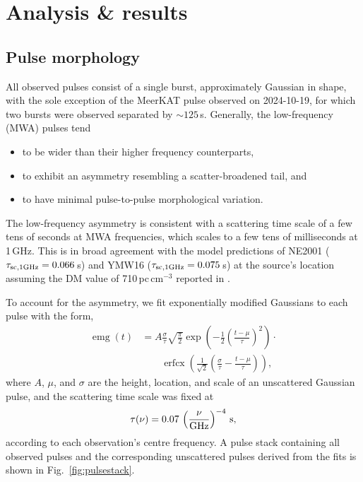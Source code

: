 \documentclass[fleqn,usenatbib]{mnras}
\DeclareMathOperator{\erfcx}{erfcx}
\DeclareMathOperator{\emg}{emg}
\newcommand{\Fig}{Fig.}
\begin{document}
\section{Analysis \& results} \label{sec:analysis}


\subsection{Pulse morphology}

All observed pulses consist of a single burst, approximately Gaussian in shape, with the sole exception of the MeerKAT pulse observed on 2024-10-19, for which two bursts were observed separated by ${\sim}125\,$s.
Generally, the low-frequency (MWA) pulses tend
\begin{itemize}
    \item to be wider than their higher frequency counterparts,
    \item to exhibit an asymmetry resembling a scatter-broadened tail, and
    \item to have minimal pulse-to-pulse morphological variation.
\end{itemize}

The low-frequency asymmetry is consistent with a scattering time scale of a few tens of seconds at MWA frequencies, which scales to a few tens of milliseconds at 1\,GHz.
This is in broad agreement with the model predictions of NE2001 ($\tau_{\rm sc,1GHz} = 0.066\,$s) and YMW16 ($\tau_{\rm sc,1 GHz} = 0.075\,$s) at the source's location assuming the DM value of 710\,pc\,cm$^{-3}$ reported in .

To account for the asymmetry, we fit exponentially modified Gaussians to each pulse with the form,
\begin{equation}
  \begin{aligned}
        \emg(t) &= A \frac{\sigma}{\tau}\sqrt{\frac{\pi}{2}}
                   \exp\left(-\frac12 \left( \frac{t - \mu}{\tau} \right)^2 \right) \cdot {} \\
                            &\qquad \erfcx \left(\frac{1}{\sqrt{2}} \left(\frac{\sigma}{\tau} 
                             - \frac{t - \mu}{\tau} \right) \right),
  \end{aligned}
  \label{eqn:emg}
\end{equation}
where $A$, $\mu$, and $\sigma$ are the height, location, and scale of an unscattered Gaussian pulse, and the scattering time scale was fixed at
\begin{equation}
      \tau(\nu) = 0.07\, \left(\frac{\nu}{\rm GHz}\right)^{-4} \, {\rm s},
\end{equation}
according to each observation's centre frequency.
A pulse stack containing all observed pulses and the corresponding unscattered pulses derived from the fits is shown in \Fig~\ref{fig:pulsestack}.
\end{document}
